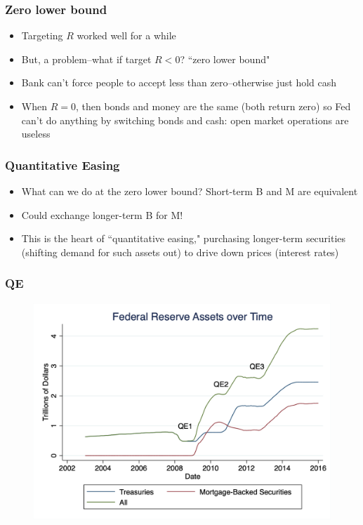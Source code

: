 \documentclass{beamer}
\begin{document}
\begin{frame}
\frametitle[alignment=center]{Zero lower bound}
\begin{itemize}
\item Targeting $R$ worked well for a while
\bigskip
\item But, a problem--what if target $R<0$?  ``zero lower bound"
\bigskip
\item Bank can't force people to accept less than zero--otherwise just hold cash
\bigskip
\item When $R=0$, then bonds and money are the same (both return zero) so Fed can't do anything by switching bonds and cash: open market operations are useless 
\end{itemize}
\end{frame}

\begin{frame}
\frametitle[alignment=center]{Quantitative Easing}
\begin{itemize}
\item What can we do at the zero lower bound?  Short-term B and M are equivalent
\bigskip
\item Could exchange longer-term B for M!
\bigskip
\item This is the heart of ``quantitative easing," purchasing longer-term securities (shifting demand for such assets out) to drive down prices (interest rates)
\end{itemize}
\end{frame}

\begin{frame}
\frametitle[alignment=center]{QE}
\begin{figure}
\centering
\includegraphics[scale=0.2]{Figures/Fig_12pt16a.png}
\end{figure}
\end{frame}
\end{document}
